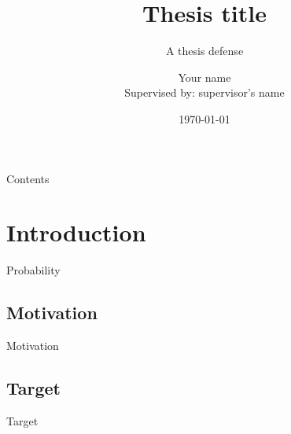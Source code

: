 \documentclass[12pt]{beamer}
\title{Thesis title}
\subtitle{A thesis defense}
\author[Your name]{Your name\\ \small{Supervised by: supervisor's name}}
\institute[SUSTech]{Southern University of Science and Technology(SUSTech)}
\date{\today}
\begin{document}
\frame{\titlepage}

\begin{frame}{Contents}
    \tableofcontents[hidesubsections]
\end{frame}

\section{Introduction}                   %
\begin{frame}{Probability}
  
\end{frame}
\subsection{Motivation}                       %
  \begin{frame}{Motivation}
    
  \end{frame}

\subsection{Target}                        %
  \begin{frame}{Target}
      
  \end{frame}

 
\end{document}
